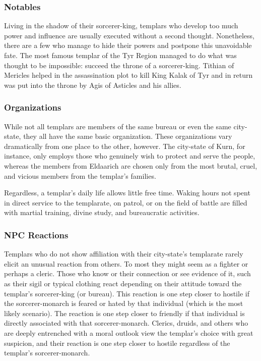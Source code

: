 \subsubsection{Notables}
Living in the shadow of their sorcerer-king, templars who develop too much power and influence are usually executed without a second thought. Nonetheless, there are a few who manage to hide their powers and postpone this unavoidable fate. The most famous templar of the Tyr Region managed to do what was thought to be impossible: succeed the throne of a sorcerer-king. Tithian of Mericles helped in the assassination plot to kill King Kalak of Tyr and in return was put into the throne by Agis of Asticles and his allies.

\subsubsection{Organizations}
While not all templars are members of the same bureau or even the same city-state, they all have the same basic organization. These organizations vary dramatically from one place to the other, however. The city-state of Kurn, for instance, only employs those who genuinely wish to protect and serve the people, whereas the members from Eldaarich are chosen only from the most brutal, cruel, and vicious members from the templar's families.

Regardless, a templar's daily life allows little free time. Waking hours not spent in direct service to the templarate, on patrol, or on the field of battle are filled with martial training, divine study, and bureaucratic
activities.

\subsubsection{NPC Reactions}
Templars who do not show affiliation with their city-state's templarate rarely elicit an unusual reaction from others. To most they might seem as a fighter or perhaps a cleric. Those who know or their connection or see evidence of it, such as their sigil or typical clothing react depending on their attitude toward the templar's sorcerer-king (or bureau). This reaction is one step closer to hostile if the sorcerer-monarch is feared or hated by that individual (which is the most likely scenario). The reaction is one step closer to friendly if that individual is directly associated with that sorcerer-monarch. Clerics, druids, and others who are deeply entrenched with a moral outlook view the templar's choice with great suspicion, and their reaction is one step closer to hostile regardless of the templar's sorcerer-monarch.

